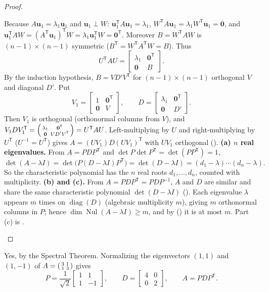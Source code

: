 \documentclass[10pt]{scrartcl}
\newcommand{\vv}[1]{\mathbf{#1}}
\DeclareMathOperator{\Nul}{Nul}
\begin{document}
\begin{proof}
\begin{steps}
\[    \]
    Because $A\vv u_1=\lambda_1\vv u_1$ and $\vv u_1\perp W$: $\vv u_1^{\mathsf T}A\vv u_1=\lambda_1$, $W^{\mathsf T}A\vv u_1=\lambda_1 W^{\mathsf T}\vv u_1=\vv 0$, and $\vv u_1^{\mathsf T}AW=(A^{\mathsf T}\vv u_1)^{\mathsf T}W=\lambda_1\vv u_1^{\mathsf T}W=\vv 0^{\mathsf T}$. Moreover $B=W^{\mathsf T}AW$ is $(n-1)\times(n-1)$ symmetric ($B^{\mathsf T}=W^{\mathsf T}A^{\mathsf T}W=B$). Thus
    \[
      U^{\mathsf T}AU = \begin{bmatrix}\lambda_1 & \vv 0^{\mathsf T}\\\vv 0 & B\end{bmatrix}.
    \]
    \ii By the induction hypothesis, $B=VD'V^{\mathsf T}$ for $(n-1)\times(n-1)$ orthogonal $V$ and diagonal $D'$. Put
    \[
      V_1 = \begin{bmatrix}1&\vv 0^{\mathsf T}\\\vv 0&V\end{bmatrix}, \qquad D = \begin{bmatrix}\lambda_1&\vv 0^{\mathsf T}\\\vv 0&D'\end{bmatrix}.
    \]
    Then $V_1$ is orthogonal (orthonormal columns from $V$), and $V_1DV_1^{\mathsf T}=\begin{psmallmatrix}\lambda_1&\vv 0^{\mathsf T}\\\vv 0&VD'V^{\mathsf T}\end{psmallmatrix}=U^{\mathsf T}AU$. Left-multiplying by $U$ and right-multiplying by $U^{\mathsf T}$ ($U^{-1}=U^{\mathsf T}$) gives $A=(UV_1)D(UV_1)^{\mathsf T}$ with $UV_1$ orthogonal ().
    \ii \textbf{(a) $n$ real eigenvalues.} From $A=PDP^{\mathsf T}$ and $\det P\det P^{\mathsf T}=\det(PP^{\mathsf T})=1$,
    \[
      \det(A-\lambda I)=\det\bigl(P(D-\lambda I)P^{\mathsf T}\bigr)=\det(D-\lambda I)=(d_1-\lambda)\cdots(d_n-\lambda).
    \] So the characteristic polynomial has the $n$ real roots $d_1,\dots,d_n$, counted with multiplicity.
    \ii \textbf{(b) and (c).} From $A=PDP^{\mathsf T}=PDP^{-1}$, $A$ and $D$ are similar and share the same characteristic polynomial $\det(D-\lambda I)$ (). Each eigenvalue $\lambda$ appears $m$ times on $\operatorname{diag}(D)$ (algebraic multiplicity $m$), giving $m$ orthonormal columns in $P$; hence $\dim\Nul(A-\lambda I)\ge m$, and by () it is at most $m$. Part (c) is . \qedhere
  \end{steps}
\end{proof}

\revisit Yes, by the Spectral Theorem. Normalizing the eigenvectors $(1,1)$ and $(1,-1)$ of $A=\begin{psmallmatrix}3&1\\1&3\end{psmallmatrix}$ gives
\[
  P = \frac{1}{\sqrt{2}}\begin{bmatrix}1&1\\1&-1\end{bmatrix}, \qquad
  D = \begin{bmatrix}4&0\\0&2\end{bmatrix}, \qquad
  A = PDP^{\mathsf T}.
\]
\end{document}
